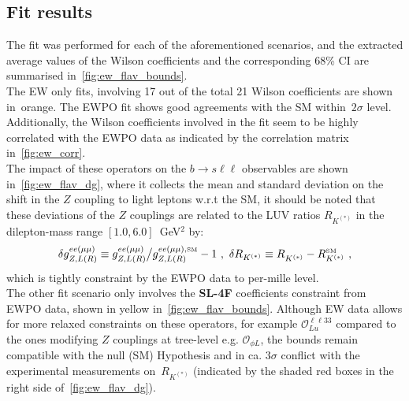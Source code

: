 \subsection{Fit results}
\label{sec:EFT_results}
The fit was performed for each of the aforementioned scenarios, and the extracted average values of the Wilson coefficients and the corresponding 68\% CI are summarised in~\autoref{fig:ew_flav_bounds}.\\ The EW only fits, involving 17 out of the total 21 Wilson coefficients are shown in~\textcolor[HTML]{be3d04}{orange}. The EWPO fit shows good agreements with the SM within~$2\sigma$ level. Additionally, the Wilson coefficients involved in the fit seem to be highly correlated with the EWPO data as indicated by the correlation matrix in~\autoref{fig:ew_corr}. \\
The impact of these operators on the $ b \to s \ell \ell$ observables are shown in~\autoref{fig:ew_flav_dg}, where  it collects the mean and standard deviation on the shift in the $Z$ coupling to light leptons w.r.t the SM, it should be noted that these deviations of the $Z$ couplings are related to the LUV ratios   $R_{K^{(*)}}$ in the dilepton-mass range $[1.0,6.0]$~GeV$^2$ by: 
\begin{equation}
	\label{eq:SMdev}
	\delta g_{Z,L(R)}^{ee(\mu\mu)} \equiv g_{Z,L(R)}^{ee(\mu\mu)}{\big/}g_{Z,L(R)}^{ee(\mu\mu),\textrm{\tiny SM}}-1  \ , \ \delta R_{K^{(*)}} \equiv R_{K^{(*)}}^{ } - R_{K^{(*)}}^{\textrm{\tiny SM}} \ ,
\end{equation}
which is tightly constraint by the EWPO data to per-mille level. \\
The other fit scenario only involves the \textbf{ SL-4F} coefficients constraint from EWPO data, shown in \textcolor[HTML]{c2b109}{yellow}  in~\autoref{fig:ew_flav_bounds}. Although EW data allows for more relaxed constraints on these operators, for example $\mathcal{O}_{Lu}^{\ell \ell 33}$ compared to the ones modifying $Z$ couplings at tree-level e.g. $\mathcal{O}_{\phi L}$, the bounds remain compatible with the null (SM) Hypothesis and in ca. $3\sigma$ conflict with the experimental measurements on~$R_{K^{(*)}}$  (indicated by the shaded red boxes in the right side of~\autoref{fig:ew_flav_dg}).  
\\
